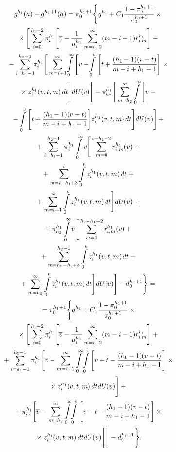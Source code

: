 \begin{multicols}{2}
\noindent
  \begin{multline*}
  g^{h_1}(a)-g^{h_1+1}(a)=
   \pi_0^{h_1+1} \Bigg\{ 
   g^{h_1} +C_1\displaystyle\frac{\displaystyle 1-\pi_0^{h_1+1}\mathstrut}{\displaystyle  \pi_0^{h_1+1}\mathstrut}\times{}\\[0.9pt]
   {}\times \Bigg[ \sum\limits_{i=0}^{h_1-2} \pi_i^{h_1} \Bigg[ 
   \overline{v}-\displaystyle\frac{\displaystyle 1\mathstrut}{\displaystyle \mu_i^{h_1}\mathstrut} \sum\limits_{m=i+2}^\infty (m-i-1) r^{h_1}_{i,m}\Bigg]-{}\\[0.9pt]
   {}-
   \sum\limits_{i=h_1-1}^{h_2-1} \!\! \pi_i^{h_1} \Bigg[ \sum\limits^\infty_{m=i+1} \!\int\limits_0^\infty \Bigg[ 
 v- \!\int\limits_0^v \Bigg[ t+ \displaystyle\frac{\displaystyle (h_1-1)(v-t)\mathstrut}{\displaystyle m-i+h_1-1\mathstrut}\Bigg] \times{}\\[0.9pt]
 {}\times
 z_i^{h_1}(v,t,m)\,dt\Bigg] dU(v)\Bigg]-
 \pi^{h_1}_{h_2} \Bigg[ \sum\limits^\infty_{m=h_2} \int\limits_0^\infty \Bigg[ v-{}\\[0.9pt]
 {}- \int\limits_0^v \Bigg [ t+ 
\displaystyle\frac{\displaystyle (h_1-1)(v-t)\mathstrut}{\displaystyle m-i+h_1-1\mathstrut}\Bigg] z_i^{h_1}(v,t,m)\,dt\Bigg] dU(v)\Bigg]+{}\\[0.9pt]
   {}+
   \sum\limits_{i=h_1-1}^{h_2-1} \pi_i^{h_1} \int\limits_0^\infty v \Bigg[ \sum\limits_{m=0}^{i-h_1+2} 
r_{i,m}^{h_1}(v) +{}\\[0.9pt]
{}+
\sum\limits^i_{m=i-h_1+3} \int\limits_0^v z_i^{h_1}(v,t,m)\,dt+{}\\[0.9pt]
{}+
   \sum\limits^\infty_{m=i+1} \int\limits_0^v z_i^{h_1}(v,t,m)\,dt \Bigg] dU(v) +{}\\[0.9pt]
   {}+\pi^{h_1}_{h_2} 
\int\limits_0^\infty v \Bigg[ \sum\limits_{m=0}^{h_2-h_1+2} r^{h_1}_{i,m}(v)+{}\\[0.9pt]
   {}+
   \sum\limits_{m=h_2-h_1+3}^{h_2-1} \int\limits_0^v z_i^{h_1}(v,t,m)\,dt +{}\\[0.9pt]
   {}+
   \sum\limits^\infty_{m=h_2} \int\limits_0^v z_i^{h_1}(v,t,m)\,dt\Bigg] dU(v)\Bigg] - 
d_0^{h_1+1}\Bigg\}={}\\[0.9pt]
   {}=
   \pi_0^{h_1+1} \Bigg\{ g^{h_1} +C_1\displaystyle\frac{\displaystyle 1-\pi_0^{h_1+1}\mathstrut}{\displaystyle \pi_0^{h_1+1}\mathstrut} \times{}\\[0.9pt]
   {}\times \Bigg[ \sum\limits_{i=0}^{h_1-2} 
\pi_i^{h_1}\Bigg[ \overline{v} -\displaystyle\frac{\displaystyle 1\mathstrut}{\displaystyle \mu_i^{h_1}\mathstrut} \sum\limits_{m=i+2}^\infty (m-i-1) r^{h_1}_{i,m}\Bigg]+{}\\[0.9pt]
   {}+
   \sum\limits_{i=h_1-1}^{h_2-1} \pi_i^{h_1} \Bigg[ \overline{v} - \sum\limits^\infty_{m=i+1} 
\int\limits_0^\infty \!\int\limits_0^v \Bigg[ v-t-\displaystyle\frac{\displaystyle (h_1-1)(v-t)\mathstrut}{\displaystyle m-i+h_1-1\mathstrut}\Bigg]\times{}\\[0.9pt]
{}\times z_i^{h_1}(v,t,m)\,dt  dU(v)\Bigg] +{}\\[0.9pt]
   {}+
  \pi^{h_1}_{h_2} \Bigg[ \overline{v} - \sum\limits_{m=h_2}^\infty 
\int\limits_0^\infty\! \int\limits_0^v \Bigg[ v-t-\displaystyle\frac{\displaystyle (h_1-1)(v-t)\mathstrut}{\displaystyle m-i+h_1-1\mathstrut}\Bigg] \times{}\\[0.9pt]
{}\times 
z_i^{h_1}(v,t,m)\,dt dU(v)\Bigg] \Bigg]-  d_0^{h_1+1}\Bigg\}.
  \end{multline*}
  

\end{multicols}

